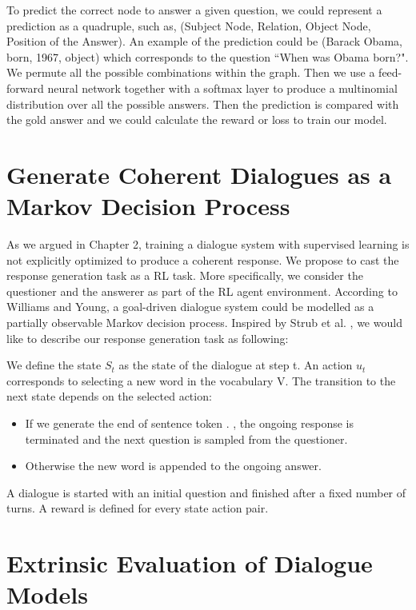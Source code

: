 \documentclass[bsc,frontabs,twoside,singlespacing,parskip,deptreport]{infthesis}     %
\begin{document}
To predict the correct node to answer a given question, we could represent a prediction as a quadruple, such as, (Subject Node, Relation, Object Node, Position of the Answer). An example of the prediction could be (Barack Obama, born, 1967, object) which corresponds to the question ``When was Obama born?". We permute all the possible combinations within the graph. Then we use a feed-forward neural network together with a softmax layer to produce a multinomial distribution over all the possible answers. Then the prediction is compared with the gold answer and we could calculate the reward or loss to train our model.

\section{Generate Coherent Dialogues as a Markov Decision Process}
\noindent
As we argued in Chapter 2, training a dialogue system with supervised learning is not explicitly optimized to produce a coherent response. We propose to cast the response generation task as a RL task. More specifically, we consider the questioner and the answerer as part of the RL agent environment. According to Williams and Young\cite{williams2007partially}, a goal-driven dialogue system could be modelled as a partially observable Markov decision process. Inspired by Strub et al. \cite{strub2017end}, we would like to describe our response generation task as following:

We define the state $S_t$ as the state of the dialogue at step t. An action $u_t$ corresponds to selecting a new word in the vocabulary V. The transition to the next state depends on the selected action:

\begin{itemize}
\item If we generate the end of sentence token . , the ongoing response is terminated and the next question is sampled from the questioner.
\item Otherwise the new word is appended to the ongoing answer.
\end{itemize}

A dialogue is started with an initial question and finished after a fixed number of turns. A reward is defined for every state action pair. 

\section{Extrinsic Evaluation of Dialogue Models}
\noindent
\end{document}
